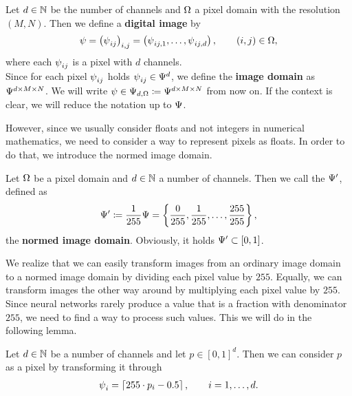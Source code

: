 \begin{definition}\label{def:image}
Let $d\in\N$ be the number of channels and $\O$ a pixel domain with the resolution $(M,N)$. Then we define a \textbf{digital image} by
\begin{align*}
\p=\left(\p_{ij}\right)_{i,j} = \left(\p_{ij,1},\ldots,\p_{ij,d} \right),\qquad (i,j)\in\O,
\end{align*}
where each $\p_{ij}$ is a pixel with $d$ channels.\\
Since for each pixel $\p_{ij}$ holds $\p_{ij}\in\P^d$, we define the \textbf{image domain} as $\P^{d\times M\times N}$. We will write $\p\in\P_{d,\O}\coloneqq \P^{d \times M\times N}$ from now on. If the context is clear, we will reduce the notation up to $\P$.
\end{definition}


However, since we usually consider floats and not integers in numerical mathematics, we need to consider a way to represent pixels as floats. In order to do that, we introduce the normed image domain.


\begin{definition}\label{def:normed_image_domain}
Let $\O$ be a pixel domain and  $d\in\N$ a number of channels. Then we call the $\P^\prime$, defined as
\begin{align*}
\P^\prime \coloneqq \frac{1}{255} \P = \left\{\frac{0}{255}, \frac{1}{255}, \ldots, \frac{255}{255} \right\},
\end{align*}
the \textbf{normed image domain}. Obviously, it holds $\P^\prime \subset [0,1]$.
\end{definition}

We realize that we can easily transform images from an ordinary image domain to a normed image domain by dividing each pixel value by $255$. Equally, we can transform images the other way around by multiplying each pixel value by $255$.\\
Since neural networks rarely produce a value that is a fraction with denominator $255$, we need to find a way to process such values. This we will do in the following lemma.


\begin{lemma}
Let $d\in\N$ be a number of channels and let $p\in [0,1]^d$. Then we can consider $p$ as a pixel by transforming it through
\begin{align*}
\p_i = \left\lceil 255 \cdot p_i - 0.5 \right\rceil, \qquad i=1,\ldots,d.
\end{align*}
\end{lemma}

